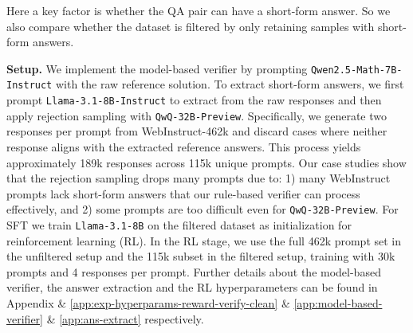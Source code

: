 Here a key factor is whether the QA pair can have a short-form answer. So we also compare whether the dataset is filtered by only retaining samples with short-form answers. 

\noindent\textbf{Setup.}
We implement the model-based verifier by prompting \texttt{Qwen2.5-Math-7B-Instruct} with the raw reference solution.
To extract short-form answers, we first prompt \texttt{Llama-3.1-8B-Instruct} to extract from the raw responses and then apply rejection sampling with \texttt{QwQ-32B-Preview}. Specifically, we generate two responses per prompt from WebInstruct-462k and discard cases where neither response aligns with the extracted reference answers. This process yields approximately 189k responses across 115k unique prompts.
Our case studies show that the rejection sampling drops many prompts due to:
1) many WebInstruct prompts lack short-form answers that our rule-based verifier can process effectively,
and 2) some prompts are too difficult even for \texttt{QwQ-32B-Preview}.
For SFT we train \texttt{Llama-3.1-8B} on the filtered dataset as initialization for reinforcement learning (RL).
In the RL stage, we use the full 462k prompt set in the unfiltered setup and the 115k subset in the filtered setup, training with 30k prompts and 4 responses per prompt.
Further details about the model-based verifier, the answer extraction and the RL hyperparameters can be found in Appendix  \& \ref{app:exp-hyperparams-reward-verify-clean} \& \ref{app:model-based-verifier} \& \ref{app:ans-extract} respectively.

\begin{table}[htbp]
\vspace{-15pt}
\caption{Performance of RL with different verifiers and prompt filtering methods. All the models here are fine-tuned from \texttt{Llama-3.1-8B}. The ``MATH Baseline'' is the model trained with SFT and RL on MATH only in Table \ref{tab:diverse-silver-improve-general-reasoning}. The other models are trained with SFT by distillation from \texttt{QwQ-32B-Preview} and RL with different setups.}
\label{tab:verification-types}
\vskip 0.1in
\centering
\small
{}
\end{table}

